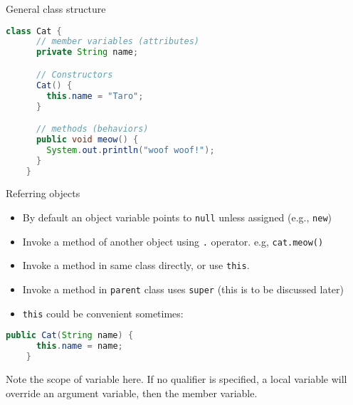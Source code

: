 \documentclass[aspectratio=169]{beamer}
\begin{document}
\begin{frame}[fragile]{General class structure}
  \begin{lstlisting}[language=Java]
    class Cat {
      // member variables (attributes)
      private String name;

      // Constructors
      Cat() {
        this.name = "Taro";
      }

      // methods (behaviors)
      public void meow() {
        System.out.println("woof woof!");
      }
    }
  \end{lstlisting}
\end{frame}

\begin{frame}[fragile]{Referring objects}
  \begin{itemize}
    \item By default an object variable points to \verb|null| unless assigned (e.g., \verb|new|)
    \item Invoke a method of another object using \verb|.| operator. e.g, \verb|cat.meow()|
    \item Invoke a method in same class directly, or use \verb|this|.
    \item Invoke a method in \verb|parent| class uses \verb|super| (this is to be discussed later)
    \item \verb|this| could be convenient sometimes:
  \end{itemize}
  \begin{lstlisting}[language=Java]
    public Cat(String name) {
      this.name = name;
    }
  \end{lstlisting}
  Note the scope of variable here. If no qualifier is specified, a local variable will override an argument
  variable, then the member variable.
\end{frame}
\end{document}
